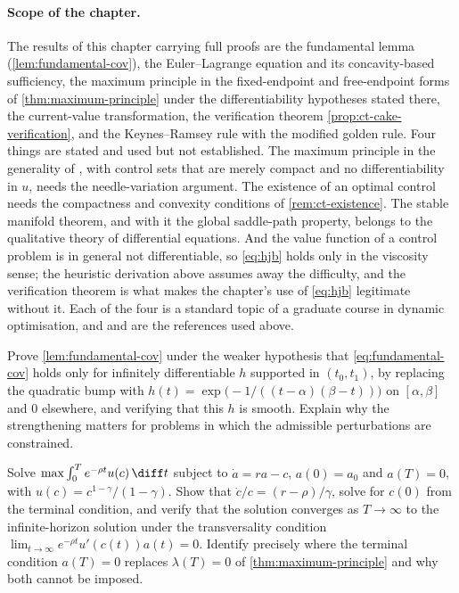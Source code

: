 \paragraph{Scope of the chapter.} The results of this chapter
carrying full proofs are the fundamental lemma
(\autoref{lem:fundamental-cov}), the Euler--Lagrange equation and its
concavity-based sufficiency, the maximum principle in the fixed-endpoint and
free-endpoint forms of \autoref{thm:maximum-principle} under the
differentiability hypotheses stated there, the current-value transformation, the
verification theorem \autoref{prop:ct-cake-verification}, and the Keynes--Ramsey
rule with the modified golden rule. Four things are stated and used but not
established. The maximum principle in the generality of
\textcite{pontryagin1962mathematical}, with control sets that are merely compact
and no differentiability in $u$, needs the needle-variation argument. The
existence of an optimal control needs the compactness and convexity conditions
of \autoref{rem:ct-existence}. The stable manifold theorem, and with it the
global saddle-path property, belongs to the qualitative theory of differential
equations. And the value function of a control problem is in general not
differentiable, so \eqref{eq:hjb} holds only in the viscosity sense; the
heuristic derivation above assumes away the difficulty, and the verification
theorem is what makes the chapter's use of \eqref{eq:hjb} legitimate without it.
Each of the four is a standard topic of a graduate course in dynamic
optimisation, and \textcite{seierstad1987optimal} and
\textcite{cesari1983optimization} are the references used above.

\begin{exercise}\label{ex:ct-1}
	Prove \autoref{lem:fundamental-cov} under the weaker hypothesis that
	\eqref{eq:fundamental-cov} holds only for infinitely differentiable $h$
	supported in $(t_0,t_1)$, by replacing the quadratic bump with
	$h(t)=\exp\bigl(-1/((t-\alpha)(\beta-t))\bigr)$ on $[\alpha,\beta]$ and $0$
	elsewhere, and verifying that this $h$ is smooth. Explain why the strengthening
	matters for problems in which the admissible perturbations are constrained.
\end{exercise}

\begin{exercise}\label{ex:ct-2}
	Solve $\max\int_0^{T}e^{-\rho t}u(c)\,\diff t$ subject to $\dot a=ra-c$,
	$a(0)=a_0$ and $a(T)=0$, with $u(c)=c^{1-\gamma}/(1-\gamma)$. Show that
	$\dot c/c=(r-\rho)/\gamma$, solve for $c(0)$ from the terminal condition, and
	verify that the solution converges as $T\to\infty$ to the infinite-horizon
	solution under the transversality condition
	$\lim_{t\to\infty}e^{-\rho t}u'(c(t))a(t)=0$. Identify precisely where the
	terminal condition $a(T)=0$ replaces $\lambda(T)=0$ of
	\autoref{thm:maximum-principle} and why both cannot be imposed.
\end{exercise}

